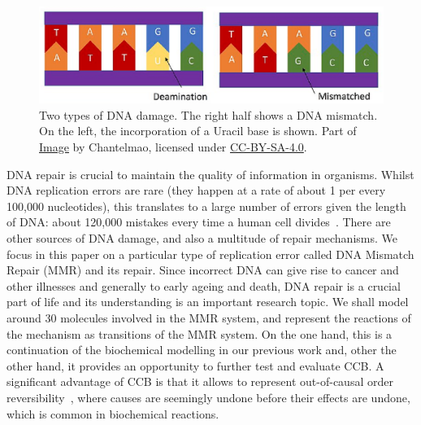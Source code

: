 \documentclass[review]{elsarticle}
\newcommand{\Red}[1]{\textcolor{red}{#1}}
\begin{document}
\begin{figure}[h!]
  \centering
    \includegraphics[width=1.0\textwidth]{Types_of_DNA_Damage_part}
  \caption[Two types of DNA damage.]{Two types of DNA damage. The right half shows a DNA mismatch.
  On the left, the incorporation of a Uracil base is shown.
  Part of \href{https://commons.wikimedia.org/wiki/File:Types_of_DNA_Damage.jpg}{Image} by Chantelmao, licensed under \href{https://creativecommons.org/licenses/by-sa/4.0/deed.en}{CC-BY-SA-4.0}.}
  \label{fig:damages}
\end{figure}

DNA repair is crucial to maintain the quality of information in organisms. Whilst DNA replication errors are rare (they happen at a rate of about 1 per every 100,000 nucleotides), this translates to a large number of errors given the length of DNA: about 120,000 mistakes every time a human cell divides~\cite{damage}. There are other sources of DNA damage, and also a multitude of repair mechanisms. We focus in this paper on a particular type of replication error called DNA Mismatch Repair (MMR) and its repair. Since incorrect DNA can give rise to cancer and other illnesses and generally to early ageing and death, DNA repair is a crucial part of life and its understanding is an important research topic.
%
We shall model around 30 molecules involved in the MMR system, and represent the reactions of the mechanism as transitions of the MMR system. On the one hand, this is a continuation of the biochemical modelling in our previous work and, other the other hand, it provides an opportunity to further test and evaluate CCB.  
A significant advantage of CCB is that it allows to represent out-of-causal order reversibility~\cite{Irek2012}, where causes are seemingly undone before their effects are undone, which is common in biochemical reactions.

\end{document}
